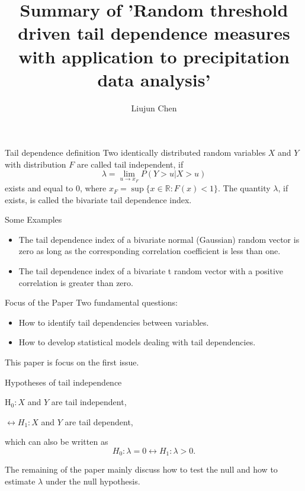 \documentclass[12pt]{beamer}
\author{Liujun Chen}
\title{Summary of 'Random threshold driven tail dependence measures with 
application to precipitation data analysis'}
\begin{document}
\begin{frame}
\titlepage
\end{frame}


\begin{frame}{Tail dependence definition}
Two identically distributed random variables $X$ and $Y$ with distribution $F$ are called tail independent, if
\begin{displaymath}
\lambda=\lim_{u \to x_F} P(Y>u | X>u)
\end{displaymath}
exists and equal to 0, where $x_F=\sup \{ x\in \mathbb{R} :F(x)<1\}$. The quantity $\lambda$, if exists, is called the bivariate tail dependence index.
\end{frame}

\begin{frame}{Some Examples}
\begin{itemize}
\item The tail
dependence index of a bivariate normal (Gaussian) random vector is zero as long
as the corresponding correlation coefficient is less than one.
\item The tail dependence
index of a bivariate t random vector with a positive correlation is greater than
zero.
\end{itemize}
\begin{center}
{}
\end{center}
\end{frame}

\begin{frame}{Focus of the Paper}
Two fundamental questions:
\begin{itemize}
\item How to identify tail dependencies between variables.
\item How to develop statistical models dealing with tail dependencies.
\end{itemize}
\vspace{3ex}
This paper is focus on the first issue.
\end{frame}

\begin{frame}{Hypotheses of tail independence}
\begin{center}
$\mathrm{H}_{0}: X$ and $Y$ are tail independent,

$\leftrightarrow H_{1}: X$ and $Y$ are tail dependent,
\end{center}
which can also be written as 
$$H_{0}: \lambda=0 \longleftrightarrow H_{1}: \lambda>0.$$

The remaining of the paper mainly discuss how to test the null and how to estimate $\lambda$ under the null hypothesis.
\end{frame}
\end{document}
